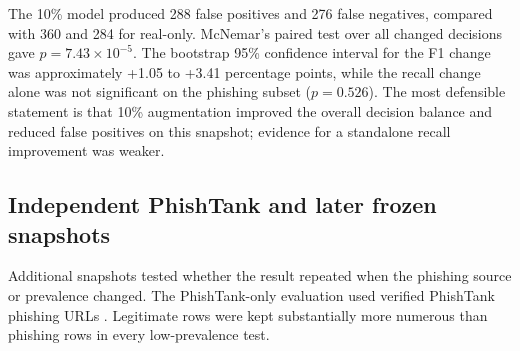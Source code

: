 The 10\% model produced 288 false positives and 276 false negatives, compared
with 360 and 284 for real-only. McNemar's paired test over all changed decisions
gave $p=7.43\times10^{-5}$. The bootstrap 95\% confidence interval for the F1
change was approximately +1.05 to +3.41 percentage points, while the recall
change alone was not significant on the phishing subset ($p=0.526$). The most
defensible statement is that 10\% augmentation improved the overall decision
balance and reduced false positives on this snapshot; evidence for a standalone
recall improvement was weaker.

\subsection{Independent PhishTank and later frozen snapshots}

Additional snapshots tested whether the result repeated when the phishing
source or prevalence changed. The PhishTank-only evaluation used verified
PhishTank phishing URLs \citep{phishtankdeveloper}. Legitimate rows were kept
substantially more numerous than phishing rows in every low-prevalence test.

\begin{table}[htbp]
\centering
\caption{External comparison of real-only and 10\% GAN-augmented HYB-MS (\%).}
\label{tab:external-summary}
\small
{}
\end{table}

